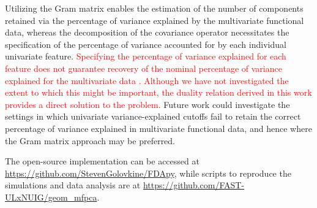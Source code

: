 Utilizing the Gram matrix enables the estimation of the number of components retained via the percentage of variance explained by the multivariate functional data, whereas the decomposition of the covariance operator necessitates the specification of the percentage of variance accounted for by each individual univariate feature. \textcolor{red}{Specifying the percentage of variance explained for each feature does not guarantee recovery of the nominal percentage of variance explained for the multivariate data \citep{golovkineEstimationNumberComponents2023}. Although we have not investigated the extent to which this might be important, the duality relation derived in this work provides a direct solution to the problem.} Future work could investigate the settings in which univariate variance-explained cutoffs fail to retain the correct percentage of variance explained in multivariate functional data, and hence where the Gram matrix approach may be preferred.

The open-source implementation can be accessed at \url{https://github.com/StevenGolovkine/FDApy}, while scripts to reproduce the simulations and data analysis are at \url{https://github.com/FAST-ULxNUIG/geom_mfpca}.


